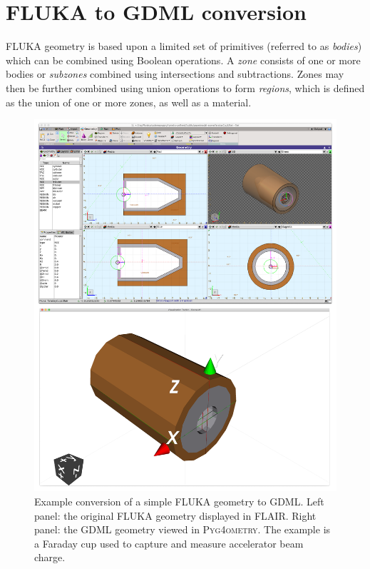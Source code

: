 \documentclass[final,5p,times,twocolumn]{elsarticle}
\newcommand{\PYGEOMETRY}{\textsc{Pyg4ometry}}
\begin{document}
\section{FLUKA to GDML conversion}
FLUKA geometry is based upon a limited set of primitives (referred to as
\textit{bodies}) which can be combined using Boolean operations. A
\textit{zone} consists of one or more bodies or \textit{subzones} combined
using intersections and subtractions.  Zones may then be further combined
using union operations to form \textit{regions}, which is defined as the
union of one or more zones, as well as a material.

\begin{figure}[htbp]
\begin{center}
\includegraphics[width=0.9\columnwidth]{./model-scene/faradayCup2.pdf}
\caption{Example conversion of a simple FLUKA geometry to GDML. Left panel:
the original FLUKA geometry displayed in FLAIR. Right panel: the GDML geometry
viewed in \PYGEOMETRY{}. The example is a Faraday cup used to capture
and measure accelerator beam charge.}
\label{fig:fluka-to-geant4-cup}
\end{center}
\end{figure}
\end{document}
